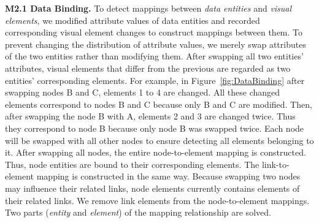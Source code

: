 {\bf M2.1 Data Binding.} \label{sec:databinding}
To detect mappings between \textit{data entities} and \textit{visual elements}, we modified attribute values of data entities and recorded corresponding visual element changes to construct mappings between them.
To prevent changing the distribution of attribute values, we merely swap attributes of the two entities rather than modifying them.
After swapping all two entities' attributes, visual elements that differ from the previous are regarded as two entities' corresponding elements.
For example, in Figure~\ref{fig:DataBinding} after swapping nodes B and C, elements 1 to 4 are changed.
All these changed elements correspond to nodes B and C because only B and C are modified. Then, after swapping the node B with A, elements 2 and 3 are changed twice. Thus they correspond to node B because only node B was swapped twice. Each node will be swapped with all other nodes to ensure detecting all elements belonging to it. After swapping all nodes, the entire node-to-element mapping is constructed. Thus, node entities are bound to their corresponding elements. The link-to-element mapping is constructed in the same way. Because swapping two nodes may influence their related links, node elements currently contains elements of their related links. We remove link elements from the node-to-element mappings. Two parts (\textit{entity} and \textit{element}) of the mapping relationship are solved.


